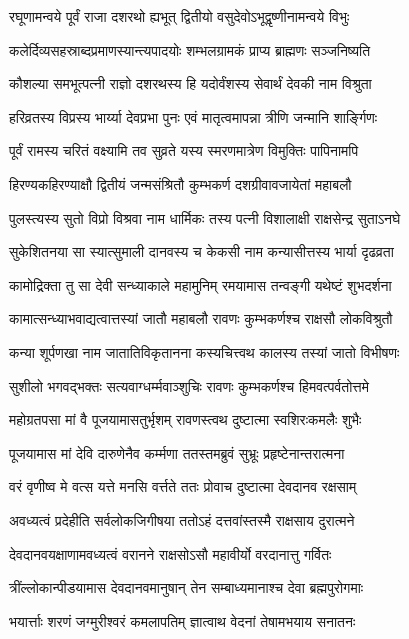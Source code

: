 \twolineshloka
{रघूणामन्वये पूर्वं राजा दशरथो ह्यभूत्}
{द्वितीयो वसुदेवोऽभूद्वृष्णीनामन्वये विभुः}%

\twolineshloka
{कलेर्दिव्यसहस्राब्दप्रमाणस्यान्त्यपादयोः}
{शम्भलग्रामकं प्राप्य ब्राह्मणः सञ्जनिष्यति}%

\twolineshloka
{कौशल्या समभूत्पत्नी राज्ञो दशरथस्य हि}
{यदोर्वंशस्य सेवार्थं देवकी नाम विश्रुता}%

\twolineshloka
{हरिव्रतस्य विप्रस्य भार्य्या देवप्रभा पुनः}
{एवं मातृत्वमापन्ना त्रीणि जन्मानि शार्ङ्गिणः}%

\twolineshloka
{पूर्वं रामस्य चरितं वक्ष्यामि तव सुव्रते}
{यस्य स्मरणमात्रेण विमुक्तिः पापिनामपि}%

\twolineshloka
{हिरण्यकहिरण्याक्षौ द्वितीयं जन्मसंश्रितौ}
{कुम्भकर्ण दशग्रीवावजायेतां महाबलौ}%

\twolineshloka
{पुलस्त्यस्य सुतो विप्रो विश्रवा नाम धार्मिकः}
{तस्य पत्नी विशालाक्षी राक्षसेन्द्र सुताऽनघे}%

\twolineshloka
{सुकेशितनया सा स्यात्सुमाली दानवस्य च}
{केकसी नाम कन्यासीत्तस्य भार्या दृढव्रता}%

\twolineshloka
{कामोद्रिक्ता तु सा देवी सन्ध्याकाले महामुनिम्}
{रमयामास तन्वङ्गी यथेष्टं शुभदर्शना}%

\twolineshloka
{कामात्सन्ध्याभवाद्यत्वात्तस्यां जातौ महाबलौ}
{रावणः कुम्भकर्णश्च राक्षसौ लोकविश्रुतौ}%

\twolineshloka
{कन्या शूर्पणखा नाम जातातिविकृतानना}
{कस्यचित्त्वथ कालस्य तस्यां जातो विभीषणः}%

\twolineshloka
{सुशीलो भगवद्भक्तः सत्यवाग्धर्म्मवाञ्शुचिः}
{रावणः कुम्भकर्णश्च हिमवत्पर्वतोत्तमे}%

\twolineshloka
{महोग्रतपसा मां वै पूजयामासतुर्भृशम्}
{रावणस्त्वथ दुष्टात्मा स्वशिरःकमलैः शुभैः}%

\twolineshloka
{पूजयामास मां देवि दारुणेनैव कर्म्मणा}
{ततस्तमब्रुवं सुभ्रूः प्रहृष्टेनान्तरात्मना}%

\twolineshloka
{वरं वृणीष्व मे वत्स यत्ते मनसि वर्त्तते}
{ततः प्रोवाच दुष्टात्मा देवदानव रक्षसाम्}%

\twolineshloka
{अवध्यत्वं प्रदेहीति सर्वलोकजिगीषया}
{ततोऽहं दत्तवांस्तस्मै राक्षसाय दुरात्मने}%

\twolineshloka
{देवदानवयक्षाणामवध्यत्वं वरानने}
{राक्षसोऽसौ महावीर्यो वरदानात्तु गर्वितः}%

\twolineshloka
{त्रींल्लोकान्पीडयामास देवदानवमानुषान्}
{तेन सम्बाध्यमानाश्च देवा ब्रह्मपुरोगमाः}%

\twolineshloka
{भयार्त्ताः शरणं जग्मुरीश्वरं कमलापतिम्}
{ज्ञात्वाथ वेदनां तेषामभयाय सनातनः}%

